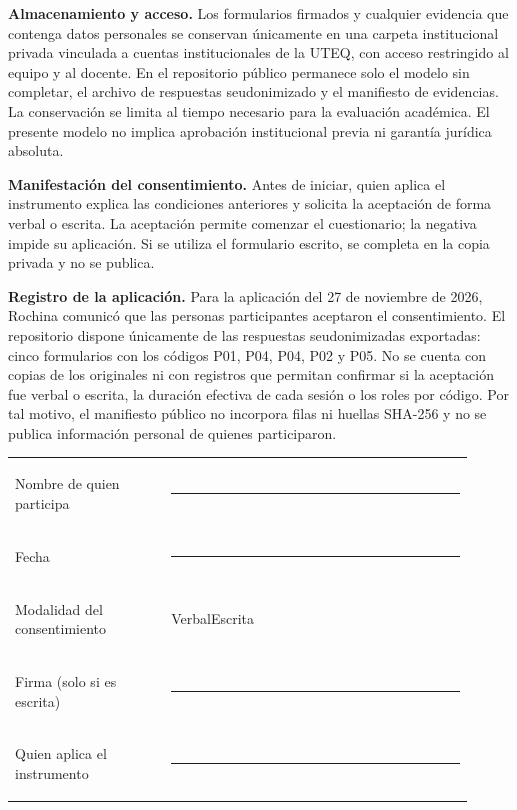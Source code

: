 \noindent\textbf{Almacenamiento y acceso.} Los formularios firmados y cualquier evidencia que contenga datos personales se conservan únicamente en una carpeta institucional privada vinculada a cuentas institucionales de la UTEQ, con acceso restringido al equipo y al docente. En el repositorio público permanece solo el modelo sin completar, el archivo de respuestas seudonimizado y el manifiesto de evidencias. La conservación se limita al tiempo necesario para la evaluación académica. El presente modelo no implica aprobación institucional previa ni garantía jurídica absoluta.

\noindent\textbf{Manifestación del consentimiento.} Antes de iniciar, quien aplica el instrumento explica las condiciones anteriores y solicita la aceptación de forma verbal o escrita. La aceptación permite comenzar el cuestionario; la negativa impide su aplicación. Si se utiliza el formulario escrito, se completa en la copia privada y no se publica.

\noindent\textbf{Registro de la aplicación.} Para la aplicación del 27 de noviembre de 2026, Rochina comunicó que las personas participantes aceptaron el consentimiento. El repositorio dispone únicamente de las respuestas seudonimizadas exportadas: cinco formularios con los códigos P01, P04, P04, P02 y P05. No se cuenta con copias de los originales ni con registros que permitan confirmar si la aceptación fue verbal o escrita, la duración efectiva de cada sesión o los roles por código. Por tal motivo, el manifiesto público no incorpora filas ni huellas SHA-256 y no se publica información personal de quienes participaron.

\vspace{4pt}
\begin{center}
\renewcommand{\arraystretch}{1.8}
\begin{tabular}{@{}>{\bfseries\raggedright\arraybackslash}p{0.31\linewidth}>{\raggedright\arraybackslash}p{0.60\linewidth}@{}}
Nombre de quien participa & \rule[-2pt]{0.95\linewidth}{0.4pt} \\
Fecha & \rule[-2pt]{0.95\linewidth}{0.4pt} \\
Modalidad del consentimiento & Verbal\quad \fbox{\rule{0pt}{1.6ex}\rule{1.6ex}{0pt}}\quad Escrita\quad \fbox{\rule{0pt}{1.6ex}\rule{1.6ex}{0pt}} \\
Firma (solo si es escrita) & \rule[-2pt]{0.95\linewidth}{0.4pt} \\
Quien aplica el instrumento & \rule[-2pt]{0.95\linewidth}{0.4pt} \\
\end{tabular}
\end{center}
\endgroup

